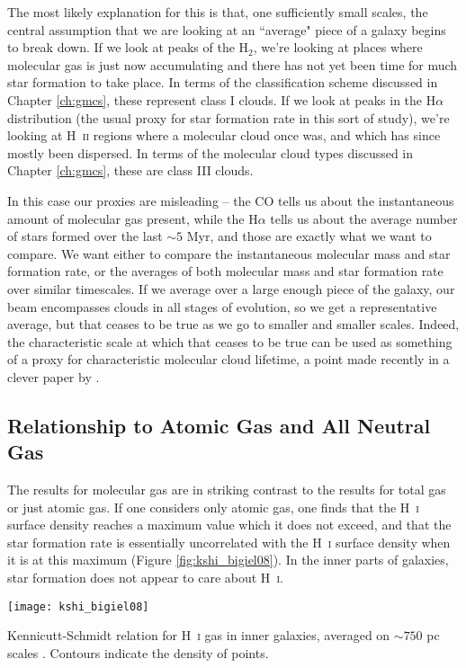 The most likely explanation for this is that, one sufficiently small scales, the central assumption that we are looking at an ``average" piece of a galaxy begins to break down. If we look at peaks of the H$_2$, we're looking at places where molecular gas is just now accumulating and there has not yet been time for much star formation to take place. In terms of the classification scheme discussed in Chapter \ref{ch:gmcs}, these represent class I clouds. If we look at peaks in the H$\alpha$ distribution (the usual proxy for star formation rate in this sort of study), we're looking at H~\textsc{ii} regions where a molecular cloud once was, and which has since mostly been dispersed. In terms of the molecular cloud types discussed in Chapter \ref{ch:gmcs}, these are class III clouds.

In this case our proxies are misleading -- the CO tells us about the instantaneous amount of molecular gas present, while the H$\alpha$ tells us about the average number of stars formed over the last $\sim 5$ Myr, and those are exactly what we want to compare. We want either to compare the instantaneous molecular mass and star formation rate, or the averages of both molecular mass and star formation rate over similar timescales. If we average over a large enough piece of the galaxy, our beam encompasses clouds in all stages of evolution, so we get a representative average, but that ceases to be true as we go to smaller and smaller scales. Indeed, the characteristic scale at which that ceases to be true can be used as something of a proxy for characteristic molecular cloud lifetime, a point made recently in a clever paper by \citet{kruijssen14c}.


\subsection{Relationship to Atomic Gas and All Neutral Gas}

The results for molecular gas are in striking contrast to the results for total gas or just atomic gas. If one considers only atomic gas, one finds that the H~\textsc{i} surface density reaches a maximum value which it does not exceed, and that the star formation rate is essentially uncorrelated with the H~\textsc{i} surface density when it is at this maximum (Figure \ref{fig:kshi_bigiel08}). In the inner parts of galaxies, star formation does not appear to care about H~\textsc{i}.
\begin{marginfigure}
\texttt{[image: kshi\_bigiel08]}
\caption[Kennicutt-Schmidt relation for H~\textsc{i} gas in inner galaxies]{
\label{fig:kshi_bigiel08}
Kennicutt-Schmidt relation for H~\textsc{i} gas in inner galaxies, averaged on $\sim 750$ pc scales \citet{bigiel08a}. Contours indicate the density of points.
}
\end{marginfigure}

